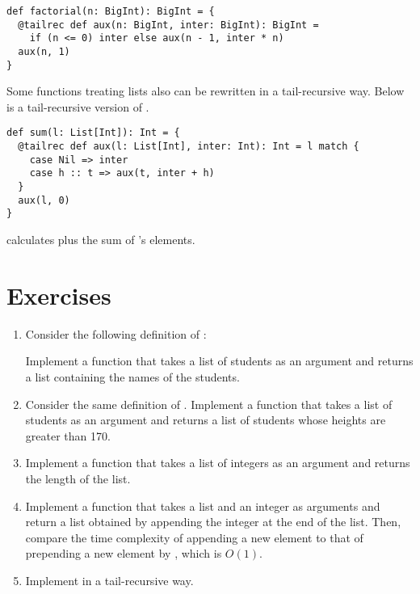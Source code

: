 \begin{verbatim}
def factorial(n: BigInt): BigInt = {
  @tailrec def aux(n: BigInt, inter: BigInt): BigInt =
    if (n <= 0) inter else aux(n - 1, inter * n)
  aux(n, 1)
}
\end{verbatim}

Some functions treating lists also can be rewritten in a tail-recursive way.
Below is a tail-recursive version of .

\begin{verbatim}
def sum(l: List[Int]): Int = {
  @tailrec def aux(l: List[Int], inter: Int): Int = l match {
    case Nil => inter
    case h :: t => aux(t, inter + h)
  }
  aux(l, 0)
}
\end{verbatim}

 calculates  plus the sum of 's elements.

\section{Exercises}

\begin{enumerate}
  \item Consider the following definition of :


    Implement a function that takes a list of students as an argument
    and returns a list containing the names of the students.

  \item Consider the same definition of .
    Implement a function that takes a list of students as an argument
    and returns a list of students whose heights are greater than 170.

  \item
    Implement a function that takes a list of integers as an argument
    and returns the length of the list.

  \item
    Implement a function that takes a list and an integer as arguments
    and return a list obtained by appending the integer at the end of the list.
    Then, compare the time complexity of appending a new element to that of
    prepending a new element by \code{::}, which is $O(1)$.

  \item
    Implement  in a tail-recursive way.
\end{enumerate}
